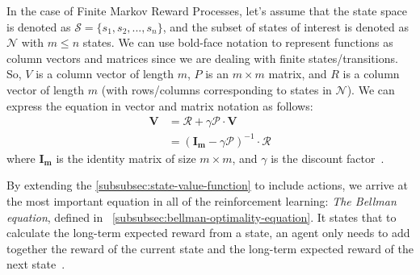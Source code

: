 \documentclass[../xlapes02]{subfiles}
\begin{document}
    In the case of Finite Markov Reward Processes, let's assume that the state space is denoted as $\mathcal{S} = \{s_1, s_2, ..., s_n\}$, and the subset of states of interest is denoted as $\mathcal{N}$ with $m \leq n$ states. We can use bold-face notation to represent functions as column vectors and matrices since we are dealing with finite states/transitions. So, $V$ is a column vector of length $m$, $P$ is an $m \times m$ matrix, and $R$ is a column vector of length $m$ (with rows/columns corresponding to states in $\mathcal{N}$). We can express the equation in vector and matrix notation as follows:
    \begin{equation}
        \begin{split}
            \bm{V}&=\bm{\mathcal{R}}+\gamma \bm{\mathcal{P}}\cdot \bm{V}\\
            &=(\bm{I_m}-\gamma \bm{\mathcal{P}})^{-1}\cdot \bm{\mathcal{R}}
        \end{split}
    \end{equation}
    where $\bm{I_m}$ is the identity matrix of size $m\times m$, and $\gamma$ is the discount factor~\cite{rao2022foundations}.

    By extending the \cref{subsubsec:state-value-function} to include actions, we arrive at the most important equation in all of the reinforcement learning: \emph{The Bellman equation}, defined in ~\cref{subsubsec:bellman-optimality-equation}. It states that to calculate the long-term expected reward from a state, an agent only needs to add together the reward of the current state and the long-term expected reward of the next state~\cite{FITMT25127}.
\end{document}
